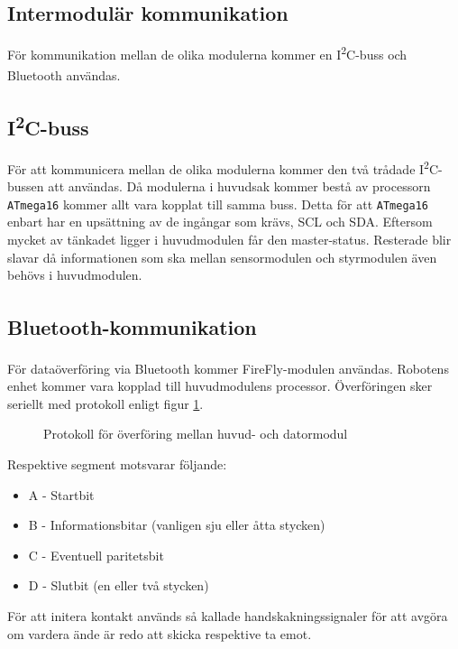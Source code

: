 \documentclass[11pt]{article}
\begin{document}
\begin{flushleft}
\pagebreak
\section{Intermodulär kommunikation}\label{Intermodulär kommunikation}
För kommunikation mellan de olika modulerna kommer en I\textsuperscript{2}C-buss och Bluetooth\textsuperscript{\circledR} användas. 

\subsection{I\textsuperscript{2}C-buss}
För att kommunicera mellan de olika modulerna kommer den två trådade I\textsuperscript{2}C-bussen att användas. Då modulerna i huvudsak kommer bestå av processorn \verb+ATmega16+ kommer allt vara kopplat till samma buss. Detta för att \verb+ATmega16+ enbart har en upsättning av de ingångar som krävs, SCL och SDA. Eftersom mycket av tänkadet ligger i huvudmodulen får den master-status. Resterade blir slavar då informationen som ska mellan sensormodulen och styrmodulen även behövs i huvudmodulen.

\subsection{Bluetooth\textsuperscript{\circledR}-kommunikation}
För dataöverföring via Bluetooth\textsuperscript{\circledR} kommer FireFly-modulen användas. Robotens enhet kommer vara kopplad till huvudmodulens processor. Överföringen sker seriellt med protokoll enligt figur \ref{bluetooth}.

\begin{figure}[htbp]
\centering
\noindent\resizebox{.8\linewidth}{!}{
	}
	\caption{Protokoll för överföring mellan huvud- och datormodul \label{bluetooth}}	
\end{figure}

Respektive segment motsvarar följande:
\begin{itemize}
	\item A - Startbit
	\item B - Informationsbitar (vanligen sju eller åtta stycken)
	\item C - Eventuell paritetsbit
	\item D - Slutbit (en eller två stycken)
\end{itemize}

För att initera kontakt används så kallade handskakningssignaler för att avgöra om vardera ände är redo att skicka respektive ta emot.


\end{flushleft}
\end{document}
